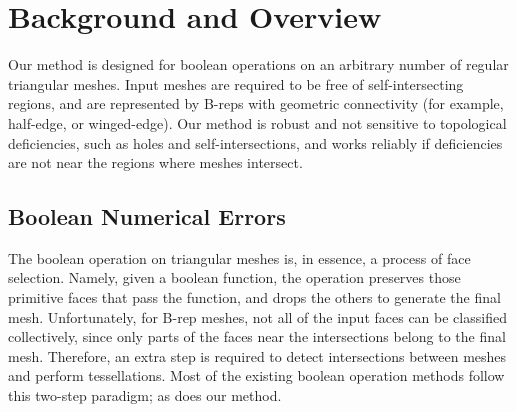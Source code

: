 
\section{Background and Overview}

\label{sec:overview}

Our method is designed for boolean operations on an arbitrary number of regular triangular meshes\cite{requicha1985boolean}. Input meshes are required to be free of self-intersecting regions, and are represented by B-reps with geometric connectivity (for example, half-edge, or winged-edge). Our method is robust and not sensitive to topological deficiencies, such as holes and self-intersections, and works reliably if deficiencies are not near the regions where meshes intersect.


\subsection{Boolean Numerical Errors}
\label{sec:paradigm}


The boolean operation on triangular meshes is, in essence, a process of face selection. Namely, given a boolean function, the operation preserves those primitive faces that pass the function, and drops the others to generate the final mesh. Unfortunately, for B-rep meshes, not all of the input faces can be classified collectively, since only parts of the faces near the intersections belong to the final mesh. Therefore, an extra step is required to detect intersections between meshes and perform tessellations. Most of the existing boolean operation methods follow this two-step paradigm; as does our method.

